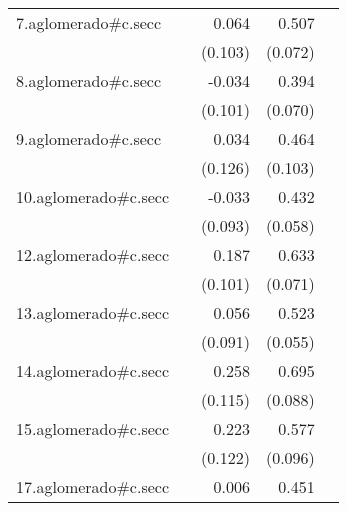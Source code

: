 {\begin{longtable}{l*{4}{D{.}{.}{-1}}}
\addlinespace
7.aglomerado#c.secc&                     &       0.064         &       0.507\sym{***}&                     \\
            &                     &     (0.103)         &     (0.072)         &                     \\
\addlinespace
8.aglomerado#c.secc&                     &      -0.034         &       0.394\sym{***}&                     \\
            &                     &     (0.101)         &     (0.070)         &                     \\
\addlinespace
9.aglomerado#c.secc&                     &       0.034         &       0.464\sym{***}&                     \\
            &                     &     (0.126)         &     (0.103)         &                     \\
\addlinespace
10.aglomerado#c.secc&                     &      -0.033         &       0.432\sym{***}&                     \\
            &                     &     (0.093)         &     (0.058)         &                     \\
\addlinespace
12.aglomerado#c.secc&                     &       0.187         &       0.633\sym{***}&                     \\
            &                     &     (0.101)         &     (0.071)         &                     \\
\addlinespace
13.aglomerado#c.secc&                     &       0.056         &       0.523\sym{***}&                     \\
            &                     &     (0.091)         &     (0.055)         &                     \\
\addlinespace
14.aglomerado#c.secc&                     &       0.258\sym{*}  &       0.695\sym{***}&                     \\
            &                     &     (0.115)         &     (0.088)         &                     \\
\addlinespace
15.aglomerado#c.secc&                     &       0.223         &       0.577\sym{***}&                     \\
            &                     &     (0.122)         &     (0.096)         &                     \\
\addlinespace
17.aglomerado#c.secc&                     &       0.006         &       0.451\sym{***}&                     \\

\end{longtable}}
